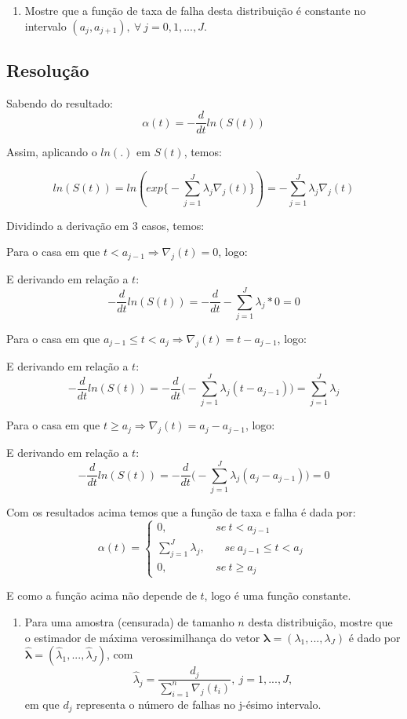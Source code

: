 \documentclass[]{article}
\providecommand{\tightlist}{%
  \setlength{\itemsep}{0pt}\setlength{\parskip}{0pt}}
\begin{document}
\begin{enumerate}
\def\labelenumi{(\alph{enumi})}
\tightlist
\item
  Mostre que a função de taxa de falha desta distribuição é constante no
  intervalo \((a_j , a_{j+1}), \ \forall \ j=0,1,...,J\).
\end{enumerate}

\subsection{Resolução}\label{resolucao-2}

Sabendo do resultado: \[\alpha(t)=-\frac{d}{dt} ln(S(t))\]

Assim, aplicando o \(ln(.)\) em \(S(t)\), temos:

\[ln(S(t))=ln(exp\Big \{ -\sum_{j=1}^J \lambda_j \nabla_j(t) \Big \})=-\sum_{j=1}^J \lambda_j \nabla_j(t)\]

Dividindo a derivação em 3 casos, temos:

Para o casa em que \(t<a_{j-1} \Rightarrow \nabla_j(t)=0\), logo:

E derivando em relação a \(t\):
\[-\frac{d}{dt} ln(S(t))=-\frac{d}{dt} -\sum_{j=1}^J \lambda_j *0=0\]

Para o casa em que
\(a_{j-1} \leq t < a_j \Rightarrow \nabla_j(t)=t-a_{j-1}\), logo:

E derivando em relação a \(t\):
\[-\frac{d}{dt} ln(S(t))=-\frac{d}{dt} \Big ( -\sum_{j=1}^J \lambda_j (t-a_{j-1}) \Big )= \sum_{j=1}^J \lambda_j\]

Para o casa em que \(t \geq a_j \Rightarrow \nabla_j(t)=a_j - a_{j-1}\),
logo:

E derivando em relação a \(t\):
\[-\frac{d}{dt} ln(S(t))=-\frac{d}{dt} \Big ( -\sum_{j=1}^J \lambda_j (a_j - a_{j-1}) \Big )= 0\]

Com os resultados acima temos que a função de taxa e falha é dada por:
\[\alpha(t)= \left\{ \begin{array}{ll}
0, \ \ \ \ \ \ \ \ \ \ \ \ \ \ \ \ \ \ \ \ se \ t<a_{j-1} \\
\sum_{j=1}^J \lambda_j, \ \ \ \ \ \ \ \ se \ a_{j-1} \leq t < a_j  \\
0, \ \ \ \ \ \ \ \ \ \ \ \ \ \ \ \ \ \ \ \ se \ t \geq a_j \end{array} \right.\ \]

E como a função acima não depende de \(t\), logo é uma função constante.

\begin{enumerate}
\def\labelenumi{(\alph{enumi})}
\setcounter{enumi}{1}
\tightlist
\item
  Para uma amostra (censurada) de tamanho \(n\) desta distribuição,
  mostre que o estimador de máxima verossimilhança do vetor
  \(\boldsymbol{\lambda}=(\lambda_1,...,\lambda_J)\) é dado por
  \(\boldsymbol{\widehat\lambda}=(\widehat\lambda_1,...,\widehat\lambda_J)\),
  com
  \[\widehat\lambda_j=\frac{d_j}{\sum^n_{i=1} \nabla_j(t_i)}, \ j=1,...,J,\]
  em que \(d_j\) representa o número de falhas no j-ésimo intervalo.
\end{enumerate}
\end{document}

